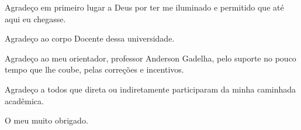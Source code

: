 \begin{agradecimentos}

Agradeço em primeiro lugar a Deus por ter me iluminado e permitido que até aqui eu chegasse. 

Agradeço ao corpo Docente dessa universidade. 

Agradeço ao meu orientador, professor Anderson Gadelha, pelo suporte no pouco tempo que lhe coube, pelas correções e incentivos. 

Agradeço a todos que direta ou indiretamente participaram da minha caminhada acadêmica. 

O meu muito obrigado. 

\end{agradecimentos}

